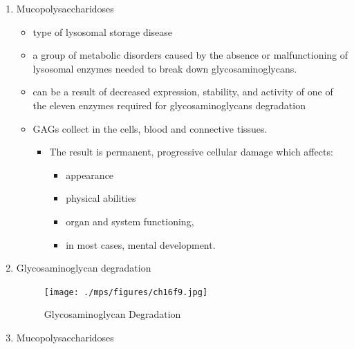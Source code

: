 \documentclass{scrartcl}
\begin{document}
\begin{enumerate}
\item Mucopolysaccharidoses
\label{sec:org2870b47}
\begin{itemize}
\item type of lysosomal storage disease
\item a group of metabolic disorders caused by the absence or
malfunctioning of lysosomal enzymes needed to break down
glycosaminoglycans.
\item can be a result of decreased expression, stability, and activity of
one of the eleven enzymes required for glycosaminoglycans
degradation
\item GAGs collect in the cells, blood and connective tissues.
\begin{itemize}
\item The result is permanent, progressive cellular damage which affects:
\begin{itemize}
\item appearance
\item physical abilities
\item organ and system functioning,
\item in most cases, mental development.
\end{itemize}
\end{itemize}
\end{itemize}

\item Glycosaminoglycan degradation
\label{sec:orgb5abbee}

\begin{figure}[htbp]
\centering
\texttt{[image: ./mps/figures/ch16f9.jpg]}
\caption[Glycosaminoglycan Degradation]{\label{fig:orga7e86f5}
Glycosaminoglycan Degradation}
\end{figure}


\item Mucopolysaccharidoses
\label{sec:orga8e473a}


\end{enumerate}
\end{document}
